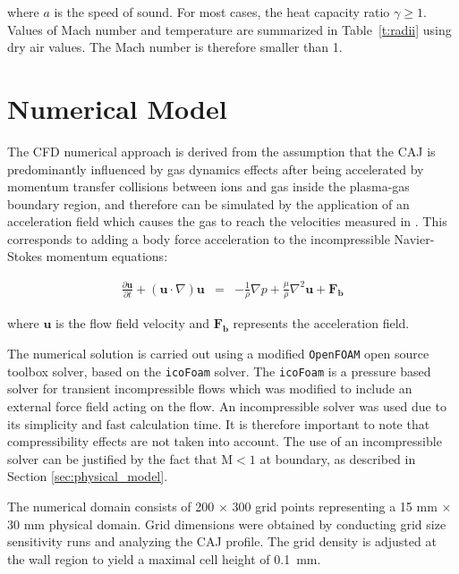 \documentclass[a4paper]{iacas}%
\begin{document}
\noindent where $a$ is the speed of sound. For most cases, the heat capacity ratio $\gamma \geq 1$. %
Values of Mach number and temperature are summarized in Table~\ref{t:radii} using dry air values. The Mach number is therefore smaller than 1.

\clearpage 

\section{Numerical Model}

The CFD numerical approach is derived from the assumption that the CAJ is predominantly influenced by gas dynamics effects after being accelerated by momentum transfer collisions between ions and gas inside the plasma-gas boundary region, and therefore can be simulated by the application of an acceleration field which causes the gas to reach the velocities measured in \cite{KR}. This corresponds to adding a body force acceleration to the incompressible Navier-Stokes momentum equations:

\begin{eqnarray}
\label{eqn:NS-Force}
\frac{\partial \boldsymbol{u}}{\partial t} + (\boldsymbol{u} \cdot \nabla)\boldsymbol{u} &=& -\frac{1}{\rho}\nabla p + \frac{\mu}{\rho} \nabla^2 \boldsymbol{u} + \boldsymbol{F_b}
\end{eqnarray}

\noindent where $\boldsymbol{u}$ is the flow field velocity and $\boldsymbol{F_b}$ represents the acceleration field.

The numerical solution is carried out using a modified \texttt{OpenFOAM} \cite{OPENFOAM} open source toolbox solver, based on the \texttt{icoFoam} solver. The \texttt{icoFoam} is a pressure based solver for transient incompressible flows which was modified to include an external force field acting on the flow. An incompressible solver was used due to its simplicity and fast calculation time. It is therefore important to note that compressibility effects are not taken into account. The use of an incompressible solver can be justified by the fact that $\mathrm{M} < 1$ at boundary, as described in Section \ref{sec:physical_model}.

The numerical domain consists of 200 $\times$ 300 grid points representing a 15 mm $\times$ 30 mm physical domain. Grid dimensions were obtained by conducting grid size sensitivity runs and analyzing the CAJ profile. The grid density is adjusted at the wall region to yield a maximal cell height of 0.1~mm. 
\end{document}
